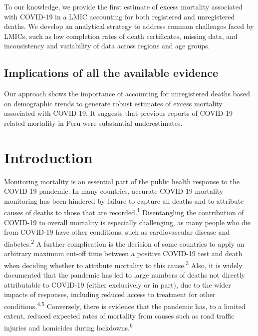 \documentclass[
]{article}
\begin{document}
To our knowledge, we provide the first estimate of excess mortality associated with COVID-19 in a LMIC accounting for both registered and unregistered deaths. We develop an analytical strategy to address common challenges faced by LMICs, such as low completion rates of death certificates, missing data, and inconsistency and variability of data across regions and age groups.

\hypertarget{implications-of-all-the-available-evidence}{%
\subsection*{Implications of all the available evidence}\label{implications-of-all-the-available-evidence}}

Our approach shows the importance of accounting for unregistered deaths based on demographic trends to generate robust estimates of excess mortality associated with COVID-19. It suggests that previous reports of COVID-19 related mortality in Peru were substantial underestimates.

\hypertarget{introduction}{%
\section{Introduction}\label{introduction}}

Monitoring mortality is an essential part of the public health response to the COVID-19 pandemic. In many countries, accurate COVID-19 mortality monitoring has been hindered by failure to capture all deaths and to attribute causes of deaths to those that are recorded.\textsuperscript{1} Disentangling the contribution of COVID-19 to overall mortality is especially challenging, as many people who die from COVID-19 have other conditions, such as cardiovascular disease and diabetes.\textsuperscript{2} A further complication is the decision of some countries to apply an arbitrary maximum cut-off time between a positive COVID-19 test and death when deciding whether to attribute mortality to this cause.\textsuperscript{3} Also, it is widely documented that the pandemic has led to large numbers of deaths not directly attributable to COVID-19 (either exclusively or in part), due to the wider impacts of responses, including reduced access to treatment for other conditions.\textsuperscript{4,5} Conversely, there is evidence that the pandemic has, to a limited extent, reduced expected rates of mortality from causes such as road traffic injuries and homicides during lockdowns.\textsuperscript{6}
\end{document}
